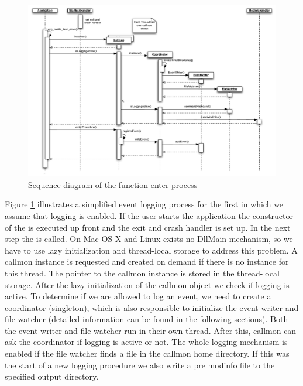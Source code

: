 \begin{figure}[ht]
\centering
\includegraphics[width=16cm]{images/callmon_sequence_diagram}
\caption{Sequence diagram of the function enter process}\label{fig:UNIXfe_figure2}
\end{figure}

Figure \ref{fig:UNIXfe_figure2} illustrates a simplified event logging process for the first  in which we assume that logging is enabled. If the user starts the application the constructor of the  is executed up front and the exit and crash handler is set up. In the next step the  is called. On Mac OS X and Linux exists no DllMain mechanism, so we have to use lazy initialization and thread-local storage to address this problem. A callmon instance is requested and created on demand if there is no instance for this thread. The pointer to the callmon instance is stored in the thread-local storage. After the lazy	initialization of the callmon object we check if logging is active. To determine if we are allowed to log an event, we need to create a coordinator (singleton), which is also responsible to initialize the event writer and file watcher (detailed information can be found in the following sections). Both the event writer and file watcher run in their own thread. After this, callmon can ask the coordinator if logging is active or not. The whole logging mechanism is enabled if the file watcher finds a  file in the callmon home directory. If this was the start of a new logging procedure we also write a pre modinfo file to the specified output directory.

